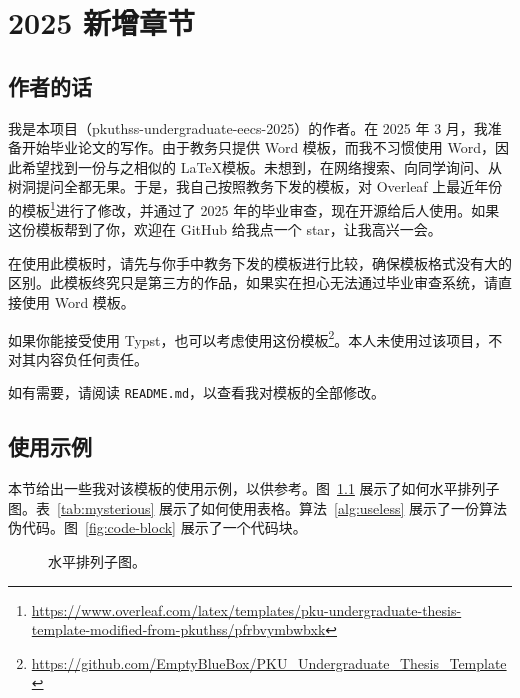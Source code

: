 
\chapter{2025 新增章节}
\label{chap:new-chapter}

\section{作者的话}

我是本项目（pkuthss-undergraduate-eecs-2025）的作者。在 2025 年 3 月，我准备开始毕业论文的写作。由于教务只提供 Word 模板，而我不习惯使用 Word，因此希望找到一份与之相似的 \LaTeX 模板。未想到，在网络搜索、向同学询问、从树洞提问全都无果。于是，我自己按照教务下发的模板，对 Overleaf 上最近年份的模板\footnote{\url{https://www.overleaf.com/latex/templates/pku-undergraduate-thesis-template-modified-from-pkuthss/pfrbvymbwbxk}}进行了修改，并通过了 2025 年的毕业审查，现在开源给后人使用。如果这份模板帮到了你，欢迎在 GitHub 给我点一个 star，让我高兴一会。

在使用此模板时，请先与你手中教务下发的模板进行比较，确保模板格式没有大的区别。此模板终究只是第三方的作品，如果实在担心无法通过毕业审查系统，请直接使用 Word 模板。

如果你能接受使用 Typst，也可以考虑使用这份模板\footnote{\url{https://github.com/EmptyBlueBox/PKU_Undergraduate_Thesis_Template}}。本人未使用过该项目，不对其内容负任何责任。

如有需要，请阅读 \texttt{README.md}，以查看我对模板的全部修改。

\section{使用示例}

本节给出一些我对该模板的使用示例，以供参考。图~\ref{fig:horizontal-subfig} 展示了如何水平排列子图。表~\ref{tab:mysterious} 展示了如何使用表格。算法~\ref{alg:useless} 展示了一份算法伪代码。图~\ref{fig:code-block} 展示了一个代码块。

\begin{figure}[ht]
\centering
{} %
\caption{水平排列子图。}
\label{fig:horizontal-subfig}
\end{figure}

